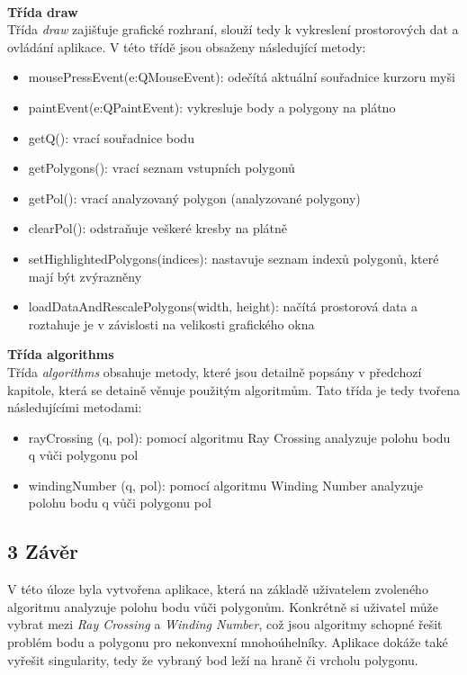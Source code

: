 \noindent\\
\textbf{Třída draw} \\
Třída \textit{draw} zajišťuje grafické rozhraní, slouží tedy k vykreslení prostorových dat a ovládání aplikace. V této třídě jsou obsaženy následující metody:
\begin{itemize}
    \item {\selectfont
mousePressEvent(e:QMouseEvent)}: odečítá aktuální souřadnice kurzoru myši
    \item {\selectfont
paintEvent(e:QPaintEvent)}: vykresluje body a polygony na plátno
    \item {\selectfont
getQ()}: vrací souřadnice bodu
    \item {\selectfont
getPolygons()}: vrací seznam vstupních polygonů
    \item {\selectfont
getPol()}: vrací analyzovaný polygon (analyzované polygony)
    \item {\selectfont
clearPol()}: odstraňuje veškeré kresby na plátně
    \item {\selectfont
setHighlightedPolygons(indices)}: nastavuje seznam indexů polygonů, které mají být zvýrazněny
    \item {\selectfont
loadDataAndRescalePolygons(width, height)}: načítá prostorová data a roztahuje je v závislosti na velikosti grafického okna
\end{itemize}

\newpage
\noindent
\textbf{Třída algorithms}\\
Třída \textit{algorithms} obsahuje metody, které jsou detailně popsány v předchozí kapitole, která se detaině věnuje použitým algoritmům. Tato třída je tedy tvořena následujícími metodami:
\begin{itemize}
    \item {\selectfont
rayCrossing (q, pol)}: pomocí algoritmu Ray Crossing analyzuje polohu bodu q vůči polygonu pol
    \item {\selectfont
windingNumber (q, pol)}: pomocí algoritmu Winding Number analyzuje polohu bodu q vůči polygonu pol
\end{itemize}

\newpage
\subsection*{3 Závěr}
\noindent V této úloze byla vytvořena aplikace, která na základě uživatelem zvoleného algoritmu analyzuje polohu bodu vůči polygonům. Konkrétně si uživatel může vybrat mezi \textit{Ray Crossing} a \textit{Winding Number}, což jsou algoritmy schopné řešit problém bodu a polygonu pro nekonvexní mnohoúhelníky. Aplikace dokáže také vyřešit singularity, tedy že vybraný bod leží na hraně či vrcholu polygonu.\\

